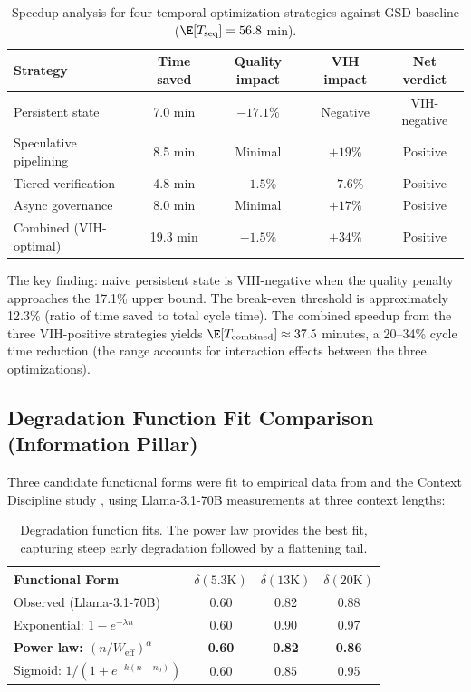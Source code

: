 \begin{table}[htbp]
\centering
\caption{Speedup analysis for four temporal optimization strategies against GSD baseline ($\E[T_{\mathrm{seq}}] = 56.8$ min).}
\label{tab:ext-speedup}
\begin{tabular}{lcccc}
\toprule
\textbf{Strategy} & \textbf{Time saved} & \textbf{Quality impact} & \textbf{VIH impact} & \textbf{Net verdict} \\
\midrule
Persistent state & 7.0 min & $-17.1\%$ & Negative & VIH-negative \\
Speculative pipelining & 8.5 min & Minimal & $+19\%$ & Positive \\
Tiered verification & 4.8 min & $-1.5\%$ & $+7.6\%$ & Positive \\
Async governance & 8.0 min & Minimal & $+17\%$ & Positive \\
\midrule
Combined (VIH-optimal) & 19.3 min & $-1.5\%$ & $+34\%$ & Positive \\
\bottomrule
\end{tabular}
\end{table}

The key finding: naive persistent state is VIH-negative when the quality penalty
approaches the 17.1\% upper bound. The break-even threshold is approximately
12.3\% (ratio of time saved to total cycle time). The combined speedup from the
three VIH-positive strategies yields $\E[T_{\mathrm{combined}}] \approx 37.5$ minutes,
a 20--34\% cycle time reduction (the range accounts for interaction effects between
the three optimizations).


\subsection{Degradation Function Fit Comparison (Information Pillar)}
\label{app:degradation-fit}

Three candidate functional forms were fit to empirical data from
\citet{du2025context} and the Context Discipline study \citep{contextdiscipline2025},
using Llama-3.1-70B measurements at three context lengths:

\begin{table}[htbp]
\centering
\caption{Degradation function fits. The power law provides the best fit, capturing steep early degradation followed by a flattening tail.}
\label{tab:ext-degradation}
\small
\begin{tabular}{lccc}
\toprule
\textbf{Functional Form} & $\delta(5.3\text{K})$ & $\delta(13\text{K})$ & $\delta(20\text{K})$ \\
\midrule
Observed (Llama-3.1-70B) & 0.60 & 0.82 & 0.88 \\
Exponential: $1 - e^{-\lambda n}$ & 0.60 & 0.90 & 0.97 \\
\textbf{Power law: $(n/W_{\text{eff}})^\alpha$} & \textbf{0.60} & \textbf{0.82} & \textbf{0.86} \\
Sigmoid: $1/(1+e^{-k(n-n_0)})$ & 0.60 & 0.85 & 0.95 \\
\bottomrule
\end{tabular}
\end{table}

